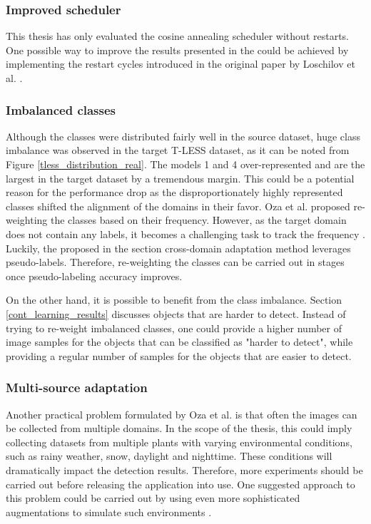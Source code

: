 \subsubsection{Improved scheduler}
This thesis has only evaluated the cosine annealing scheduler without restarts. One possible way to improve the results presented in the  could be achieved by implementing the restart cycles introduced in the original paper by Loschilov et al. \cite{Loshchilov2016}.   


\subsubsection{Imbalanced classes}
Although the classes were distributed fairly well in the source dataset, huge class imbalance was observed in the target T-LESS dataset, as it can be noted from Figure \ref{tless_distribution_real}. The models 1 and 4 over-represented and are the largest in the target dataset by a tremendous margin. This could be a potential reason for the performance drop as the disproportionately highly represented classes shifted the alignment of the domains in their favor. Oza et al. proposed re-weighting the classes based on their frequency. However, as the target domain does not contain any labels, it becomes a challenging task to track the frequency \cite{Oza2021}. Luckily, the proposed in the  section cross-domain adaptation method leverages pseudo-labels. Therefore, re-weighting the classes can be carried out in stages once pseudo-labeling accuracy improves. 

On the other hand, it is possible to benefit from the class imbalance. Section \ref{cont_learning_results} discusses objects that are harder to detect. Instead of trying to re-weight imbalanced classes, one could provide a higher number of image samples for the objects that can be classified as "harder to detect", while providing a regular number of samples for the objects that are easier to detect.

\subsubsection{Multi-source adaptation}
Another practical problem formulated by Oza et al. is that often the images can be collected from multiple domains. In the scope of the thesis, this could imply collecting datasets from multiple plants with varying environmental conditions, such as rainy weather, snow, daylight and nighttime. These conditions will dramatically impact the detection results. Therefore, more experiments should be carried out before releasing the application into use. One suggested approach to this problem could be carried out by using even more sophisticated augmentations to simulate such environments \cite{imgaug}. 


